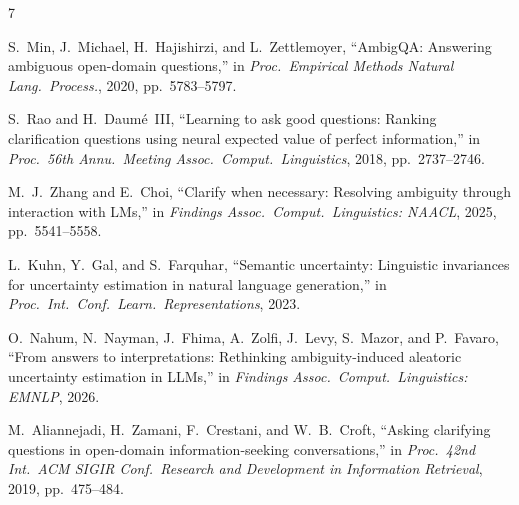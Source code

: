 \documentclass[journal]{IEEEtran}
\begin{document}
\begin{thebibliography}{7}

S.~Min, J.~Michael, H.~Hajishirzi, and L.~Zettlemoyer, ``{A}mbig{QA}: Answering ambiguous open-domain questions,'' in \emph{Proc.\ Empirical Methods Natural Lang.\ Process.}, 2020, pp.~5783--5797.

S.~Rao and H.~Daum\'e~III, ``Learning to ask good questions: Ranking clarification questions using neural expected value of perfect information,'' in \emph{Proc.\ 56th Annu.\ Meeting Assoc.\ Comput.\ Linguistics}, 2018, pp.~2737--2746.

M.~J.~Zhang and E.~Choi, ``Clarify when necessary: Resolving ambiguity through interaction with {LM}s,'' in \emph{Findings Assoc.\ Comput.\ Linguistics: NAACL}, 2025, pp.~5541--5558.

L.~Kuhn, Y.~Gal, and S.~Farquhar, ``Semantic uncertainty: Linguistic invariances for uncertainty estimation in natural language generation,'' in \emph{Proc.\ Int.\ Conf.\ Learn.\ Representations}, 2023.

O.~Nahum, N.~Nayman, J.~Fhima, A.~Zolfi, J.~Levy, S.~Mazor, and P.~Favaro, ``From answers to interpretations: Rethinking ambiguity-induced aleatoric uncertainty estimation in {LLM}s,'' in \emph{Findings Assoc.\ Comput.\ Linguistics: EMNLP}, 2026.

M.~Aliannejadi, H.~Zamani, F.~Crestani, and W.~B.~Croft, ``Asking clarifying questions in open-domain information-seeking conversations,'' in \emph{Proc.\ 42nd Int.\ ACM SIGIR Conf.\ Research and Development in Information Retrieval}, 2019, pp.~475--484.

\end{thebibliography}
\end{document}
